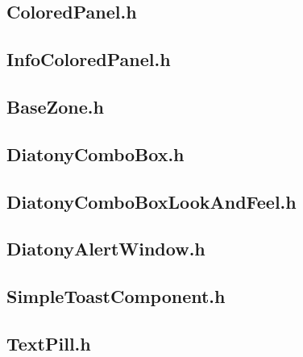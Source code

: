 \subsection{ColoredPanel.h}


\subsection{InfoColoredPanel.h}


\subsection{BaseZone.h}


\subsection{DiatonyComboBox.h}


\subsection{DiatonyComboBoxLookAndFeel.h}


\subsection{DiatonyAlertWindow.h}


\subsection{SimpleToastComponent.h}


\subsection{TextPill.h}


